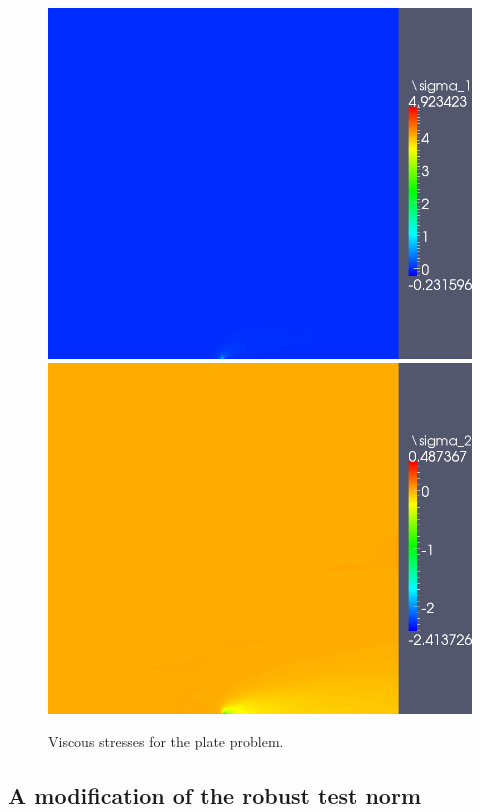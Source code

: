 \documentclass[letterpaper]{article}
\begin{document}
\begin{figure}[!h]
\centering
\includegraphics[scale=.275]{figs/LaplaceFigs/confusion1e2h1e3Sigma1.png}
\includegraphics[scale=.275]{figs/LaplaceFigs/confusion1e2h1e3Sigma2.png}
\caption{Viscous stresses for the plate problem.  }
\label{fig:plateStresses}
\end{figure}

\subsection{A modification of the robust test norm}
\end{document}

